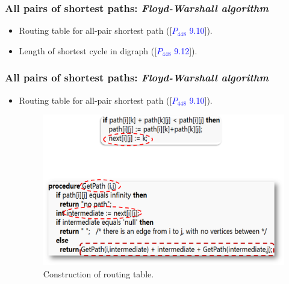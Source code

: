 \begin{frame}
  \frametitle{All pairs of shortest paths: \emph{Floyd-Warshall algorithm}}

  \begin{itemize}
    \item Routing table for all-pair shortest path ([\textcolor{blue}{$P_{448}$ 9.10}]).
    \item Length of shortest cycle in digraph ([\textcolor{blue}{$P_{448}$ 9.12}]).
  \end{itemize}

\end{frame}



\begin{frame}
  \frametitle{All pairs of shortest paths: \emph{Floyd-Warshall algorithm}}

  \begin{itemize}
    \item Routing table for all-pair shortest path ([\textcolor{blue}{$P_{448}$ 9.10}]).
    \vspace{0.50cm}

      \begin{figure}
        \begin{center}
          \includegraphics[scale=0.35]{figure/shortest_paths/route0}
          \caption{{\scriptsize Construction of routing table.}}
          \label{fig:route0}
        \end{center}
      \end{figure}
    \end{itemize}

\end{frame}



